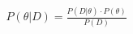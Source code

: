 \documentclass[preview]{standalone}
\begin{document}
\begin{align*}
P(\theta|D) = \frac{P(D|\theta) \cdot P(\theta)}{P(D)}
\end{align*}
\end{document}
